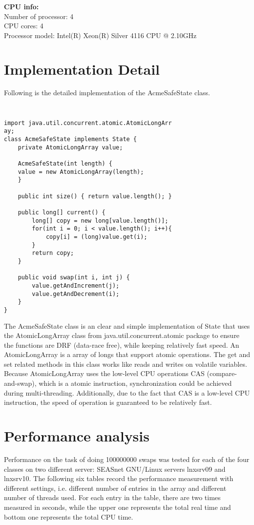 \documentclass[letterpaper,twocolumn,10pt]{article}
\begin{document}
\noindent
\textbf{CPU info:}\\
Number of processor: 4\\
CPU cores: 4\\
Processor model: Intel(R) Xeon(R) Silver 4116 CPU @ 2.10GHz\\



\section{Implementation Detail}

Following is the detailed implementation of the AcmeSafeState class.

{\tt \small
\begin{verbatim}
import java.util.concurrent.atomic.AtomicLongArr
ay;
class AcmeSafeState implements State {
    private AtomicLongArray value;
    
    AcmeSafeState(int length) { 
    value = new AtomicLongArray(length);
    }

    public int size() { return value.length(); }

    public long[] current() { 
    	long[] copy = new long[value.length()];
    	for(int i = 0; i < value.length(); i++){
    		copy[i] = (long)value.get(i);
    	}
    	return copy;
    }

    public void swap(int i, int j) {	
	    value.getAndIncrement(j);
	    value.getAndDecrement(i);
    }
}
\end{verbatim}
}

The AcmeSafeState class is an clear and simple implementation of State that uses the AtomicLongArray class from java.util.concurrent.atomic package to ensure the functions are DRF (data-race free), while keeping relatively fast speed. An AtomicLongArray is a array of longs that support atomic operations. The get and set related methods in this class works like reads and writes on volatile variables. Because AtomicLongArray uses the low-level CPU operations CAS (compare-and-swap), which is a atomic instruction, synchronization could be achieved during multi-threading. Additionally, due to the fact that CAS is a low-level CPU  instruction, the speed of operation is guaranteed to be relatively fast. 

\section{Performance analysis}

Performance on the task of doing 100000000 swaps was tested for each of the four classes on two different server:  SEASnet GNU/Linux servers lnxsrv09 and lnxsrv10. The following six tables record the performance measurement with different settings, i.e. different number of entries in the array and different number of threads used. For each entry in the table, there are two times measured in seconds, while the upper one represents the total real time and bottom one represents the total CPU time.\\
\end{document}
